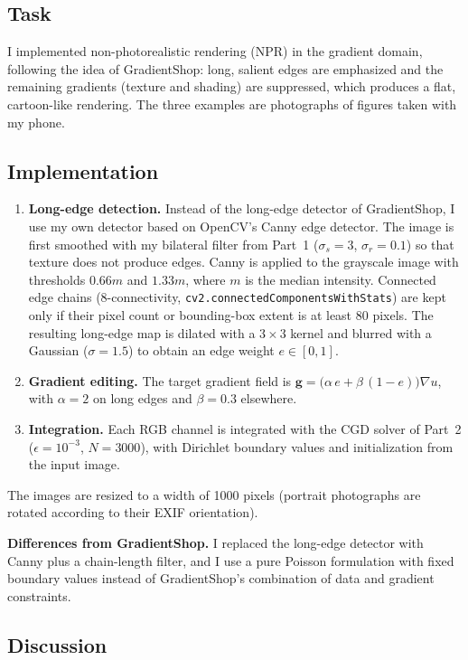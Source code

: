 \documentclass[11pt]{article}
\begin{document}
\subsection*{Task}
I implemented non-photorealistic rendering (NPR) in the gradient domain, following the idea of GradientShop: long, salient edges are emphasized and the remaining gradients (texture and shading) are suppressed, which produces a flat, cartoon-like rendering. The three examples are photographs of figures taken with my phone.

\subsection*{Implementation}
\begin{enumerate}\setlength{\itemsep}{0pt}
\item \textbf{Long-edge detection.} Instead of the long-edge detector of GradientShop, I use my own detector based on OpenCV's Canny edge detector. The image is first smoothed with my bilateral filter from Part~1 ($\sigma_s=3$, $\sigma_r=0.1$) so that texture does not produce edges. Canny is applied to the grayscale image with thresholds $0.66m$ and $1.33m$, where $m$ is the median intensity. Connected edge chains (8-connectivity, \texttt{cv2.connectedComponentsWithStats}) are kept only if their pixel count or bounding-box extent is at least 80 pixels. The resulting long-edge map is dilated with a $3\times3$ kernel and blurred with a Gaussian ($\sigma=1.5$) to obtain an edge weight $e\in[0,1]$.
\item \textbf{Gradient editing.} The target gradient field is $\mathbf{g}=\big(\alpha\,e+\beta\,(1-e)\big)\nabla u$, with $\alpha=2$ on long edges and $\beta=0.3$ elsewhere.
\item \textbf{Integration.} Each RGB channel is integrated with the CGD solver of Part~2 ($\epsilon=10^{-3}$, $N=3000$), with Dirichlet boundary values and initialization from the input image.
\end{enumerate}
The images are resized to a width of 1000 pixels (portrait photographs are rotated according to their EXIF orientation).

\textbf{Differences from GradientShop.} I replaced the long-edge detector with Canny plus a chain-length filter, and I use a pure Poisson formulation with fixed boundary values instead of GradientShop's combination of data and gradient constraints.

\subsection*{Discussion}
\end{document}
